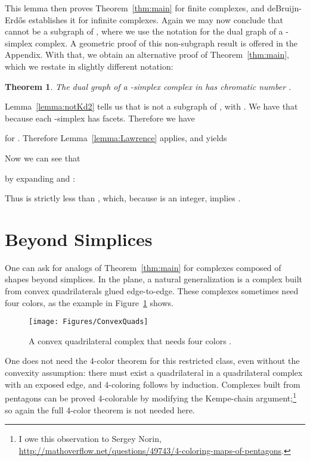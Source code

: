 \pdfoutput=1  \documentclass[]{article}
\newcommand{\ABox}{
\raisebox{3pt}{\framebox[6pt]{\rule{6pt}{0pt}}}
}
\newenvironment{proof}{{\bf Proof:}}{\hfill\ABox}
\newtheorem{theorem}{{\bf Theorem}}
\newcommand{\figlab}[1]{\label{fig:#1}}
\newcommand{\seclab}[1]{\label{sec:#1}}
\newcommand{\lemref}[1]{\ref{lemma:#1}}
\newcommand{\thmref}[1]{\ref{thm:#1}}
\newcommand{\figref}[1]{\ref{fig:#1}}
\begin{document}
This lemma then proves Theorem~\thmref{main} for finite complexes,
and deBruijn-Erd\H{o}s establishes it for infinite complexes.
Again we may now conclude that  cannot be a subgraph
of ,
where
we use the notation  for the dual graph of a -simplex
complex.
A geometric proof of this non-subgraph result is offered in the
Appendix.
With that, we obtain an alternative proof of  Theorem~\thmref{main},
which we restate in slightly different notation:
\begin{theorem}
The dual graph  of a -simplex complex in 
has chromatic number .
\end{theorem}
\begin{proof}
Lemma~\lemref{notKd2} tells us that  is not a subgraph of
,
with .
We have that  because each -simplex has  facets.
Therefore we have 

for .
Therefore
Lemma~\lemref{Lawrence} applies, and yields

Now we can see that 

by expanding  and :

Thus  is strictly less than , which, because  is an
integer,
implies .
\end{proof}



\section{Beyond Simplices}
\seclab{Beyond}
One can ask for analogs of Theorem~\thmref{main} for complexes composed
of shapes beyond simplices.
In the plane, a natural generalization is a complex built from
convex quadrilaterals glued edge-to-edge.
These complexes sometimes need four colors, as
the example in 
Figure~\figref{ConvexQuads} shows.
\begin{figure}[htbp]
\centering
\texttt{[image: Figures/ConvexQuads]}
\figlab{ConvexQuads}
\caption{A convex quadrilateral complex that needs four colors
\protect\cite[Fig.3a]{sw-rpt3c-00}.
}
\end{figure}
One does not need the 4-color theorem for this restricted class,
even without the convexity assumption:
there must exist a quadrilateral in a quadrilateral complex
with an exposed edge, and
4-coloring follows by induction.
Complexes built from pentagons 
can be proved
4-colorable by modifying the Kempe-chain argument;\footnote{
   I owe this observation to Sergey Norin,
   \url{http://mathoverflow.net/questions/49743/4-coloring-maps-of-pentagons}.
} 
so again
the full 4-color theorem is not needed here.
\end{document}
